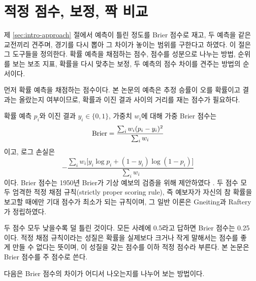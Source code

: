\section{적정 점수, 보정, 짝 비교}
\label{sec:rel-scores}

제 \ref{sec:intro-approach} 절에서 예측이 틀린 정도를 Brier 점수로 재고, 두 예측을 같은 교전끼리 견주며, 경기를 다시 뽑아 그 차이가 놓이는 범위를 구한다고 하였다. 이 절은 그 도구들을 정의한다. 확률 예측을 채점하는 점수, 점수를 성분으로 나누는 방법, 순위를 보는 보조 지표, 확률을 다시 맞추는 보정, 두 예측의 점수 차이를 견주는 방법의 순서이다.

먼저 확률 예측을 채점하는 점수이다. 본 논문의 예측은 추정 승률이 오를 확률이고 결과는 올랐는지 여부이므로, 확률과 이진 결과 사이의 거리를 재는 점수가 필요하다.

\begin{definition}
확률 예측 $p_i$와 이진 결과 $y_i \in \{0,1\}$, 가중치 $w_i$에 대해 가중 Brier 점수는
\begin{equation}
  \operatorname{Brier} = \frac{\sum_i w_i (p_i - y_i)^2}{\sum_i w_i}
  \label{eq:brier}
\end{equation}
이고, 로그 손실은
\begin{equation}
  -\frac{\sum_i w_i \bigl[ y_i \log p_i + (1 - y_i) \log (1 - p_i) \bigr]}{\sum_i w_i}
  \label{eq:logloss}
\end{equation}
이다. Brier 점수는 1950년 Brier가 기상 예보의 검증을 위해 제안하였다 \cite{brier1950verification}. 두 점수 모두 엄격한 적정 채점 규칙(strictly proper scoring rule), 즉 예보자가 자신의 참 확률을 보고할 때에만 기대 점수가 최소가 되는 규칙이며, 그 일반 이론은 Gneiting과 Raftery \cite{GneitingRaftery2007}가 정립하였다.
\end{definition}

두 점수 모두 낮을수록 덜 틀린 것이다. 모든 사례에 0.5라고 답하면 Brier 점수는 0.25이다. 적정 채점 규칙이라는 성질은 확률을 실제보다 크거나 작게 말해서는 점수를 좋게 만들 수 없다는 뜻이며, 이 성질을 갖는 점수를 이하 적정 점수라 부른다. 본 논문은 Brier 점수를 주 점수로 쓴다.

다음은 Brier 점수의 차이가 어디서 나오는지를 나누어 보는 방법이다.

